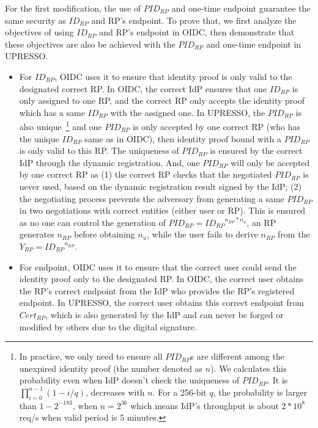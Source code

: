 For the first modification, the use of $PID_{RP}$ and one-time endpoint guarantee the same security as $ID_{RP}$ and RP's endpoint. To prove that, we first analyze the objectives of using $ID_{RP}$ and RP's endpoint in OIDC, then demonstrate that these objectives are also be achieved with the $PID_{RP}$ and one-time endpoint in UPRESSO.
\begin{itemize}
  \item For $ID_{RP}$, OIDC uses it to ensure that identity proof is only valid to the designated correct RP. In OIDC, the correct IdP ensures that one $ID_{RP}$ is only assigned to one RP, and the correct RP only accepts the identity proof which has a same $ID_{RP}$ with the assigned one.
      In UPRESSO, the $PID_{RP}$ is also unique~\footnote{In practice, we only need to ensure all $PID_{RP}$s are different among the unexpired identity proof (the number denoted as $n$). We calculates this probability even when IdP doesn't check the uniqueness of $PID_{RP}$. It is $\prod_{i=0}^{n-1}(1-i/q)$, decreases with $n$. For  a 256-bit $q$, the probability is larger than $1-2^{-183}$, when $n=2^{36}$ which means IdP's throughput is about $2*10^8$ req/s when valid period is 5 minutes.}
       and one $PID_{RP}$ is  only accepted by one correct RP (who has the unique $ID_{RP}$ same as in OIDC), then identity proof bound with a $PID_{RP}$ is only valid to this RP.
      The uniqueness of $PID_{RP}$ is ensured by the correct IdP through the dynamic registration.
      And, one $PID_{RP}$ will only be accepted by one correct RP as
      (1) the correct RP checks that the negotiated $PID_{RP}$ is never used,  based on the dynamic registration result signed by the IdP;
      (2) the negotiating process prevents the adversary from generating a same $PID_{RP}$  in two negotiations with correct entities (either user or RP).
      This is ensured as no one can control the generation of $PID_{RP}={ID_{RP}}^{n_{RP}*n_{u}}$,  an RP  generates $n_{RP}$ before obtaining $n_{u}$, while the user fails to derive $n_{RP}$ from the $Y_{RP}={ID_{RP}}^{n_{RP}}$.


   \item For endpoint, OIDC uses it to ensure that the correct user could send the identity proof only to the designated RP. In OIDC, the correct user obtains the RP's correct endpoint from the IdP who provides the RP's registered endpoint. In UPRESSO, the correct user obtains this correct endpoint from $Cert_{RP}$, which is also generated by the IdP and can never be forged or modified by others due to the digital signature.
\end{itemize}

